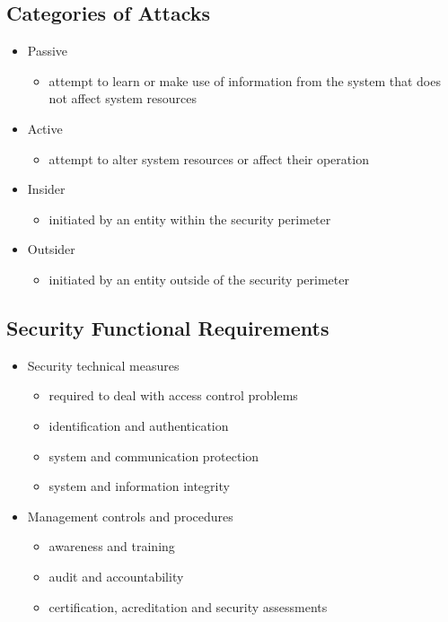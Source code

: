 \documentclass[11pt]{article}
\begin{document}
\subsection{Categories of Attacks}
\label{sec:orga6a9e71}
\begin{itemize}
\item Passive
\begin{itemize}
\item attempt to learn or make use of information from the system that does not affect system resources
\end{itemize}
\item Active
\begin{itemize}
\item attempt to alter system resources or affect their operation
\end{itemize}
\item Insider
\begin{itemize}
\item initiated by an entity within the security perimeter
\end{itemize}
\item Outsider
\begin{itemize}
\item initiated by an entity outside of the security perimeter
\end{itemize}
\end{itemize}
\subsection{Security Functional Requirements}
\label{sec:orgb87ceb6}
\begin{itemize}
\item Security technical measures
\begin{itemize}
\item required to deal with access control problems
\item identification and authentication
\item system and communication protection
\item system and information integrity
\end{itemize}
\item Management controls and procedures
\begin{itemize}
\item awareness and training
\item audit and accountability
\item certification, acreditation and security assessments
\end{itemize}
\end{itemize}
\end{document}
